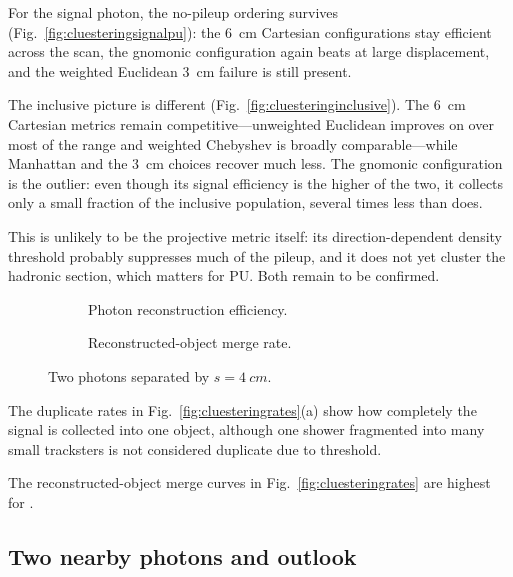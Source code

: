 For the signal photon, the no-pileup ordering survives
(Fig.~\ref{fig:cluesteringsignalpu}): the \SI{6}{cm} Cartesian configurations stay
efficient across the scan, the gnomonic configuration again beats
\cluethreed{} at large displacement, and the weighted Euclidean \SI{3}{cm} failure
is still present.

The inclusive picture is different (Fig.~\ref{fig:cluesteringinclusive}). The
\SI{6}{cm} Cartesian metrics remain competitive---unweighted Euclidean improves on
\cluethreed{} over most of the range and weighted Chebyshev is broadly
comparable---while Manhattan and the \SI{3}{cm} choices recover much less. The
gnomonic configuration is the outlier: even though its signal
efficiency is the higher of the two, it collects only a small fraction
of the inclusive population, several times less than \cluethreed{} does.

This is unlikely to be the projective metric itself: its direction-dependent
density threshold probably suppresses much of the pileup, and it does not yet
cluster the hadronic section, which matters for PU. Both remain to be confirmed.



\begin{figure}[!tp]
  \centering
  \begin{subfigure}{0.49\textwidth}
    \caption{Photon reconstruction efficiency.}
  \end{subfigure}\hfill
  \begin{subfigure}{0.49\textwidth}
    \caption{Reconstructed-object merge rate.}
  \end{subfigure}
  \caption{Two photons separated by $s=\SI{4}{cm}$.}
  \label{fig:cluesteringtwophoton}
\end{figure}

The duplicate rates in Fig.~\ref{fig:cluesteringrates}(a) show how completely
the signal is collected into one object, although one shower fragmented into many small tracksters is not considered duplicate due to threshold.

The reconstructed-object merge curves in Fig.~\ref{fig:cluesteringrates} are highest for \cluethreed{}.

\subsection{Two nearby photons and outlook}



